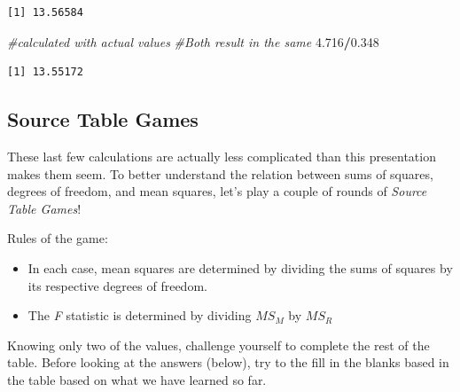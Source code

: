 \documentclass[
  11pt,
]{book}
\newenvironment{Shaded}{\begin{snugshade}}{\end{snugshade}}
\newcommand{\CommentTok}[1]{\textcolor[rgb]{0.37,0.37,0.37}{\textit{#1}}}
\newcommand{\FloatTok}[1]{\textcolor[rgb]{0.06,0.06,0.06}{#1}}
\newcommand{\SpecialCharTok}[1]{\textcolor[rgb]{0.43,0.43,0.43}{\textbf{#1}}}
\providecommand{\tightlist}{%
  \setlength{\itemsep}{0pt}\setlength{\parskip}{0pt}}
\begin{document}
\begin{verbatim}
[1] 13.56584
\end{verbatim}

\begin{Shaded}
\begin{Highlighting}[]
\CommentTok{\#calculated with actual values}
\CommentTok{\#Both result in the same}
\FloatTok{4.716}\SpecialCharTok{/}\FloatTok{0.348}
\end{Highlighting}
\end{Shaded}

\begin{verbatim}
[1] 13.55172
\end{verbatim}

\hypertarget{source-table-games}{%
\subsection{Source Table Games}\label{source-table-games}}

These last few calculations are actually less complicated than this presentation makes them seem. To better understand the relation between sums of squares, degrees of freedom, and mean squares, let's play a couple of rounds of \emph{Source Table Games}!

Rules of the game:

\begin{itemize}
\tightlist
\item
  In each case, mean squares are determined by dividing the sums of squares by its respective degrees of freedom.
\item
  The \emph{F} statistic is determined by dividing \(MS_M\) by \(MS_R\)
\end{itemize}

Knowing only two of the values, challenge yourself to complete the rest of the table. Before looking at the answers (below), try to the fill in the blanks based in the table based on what we have learned so far.
\end{document}
